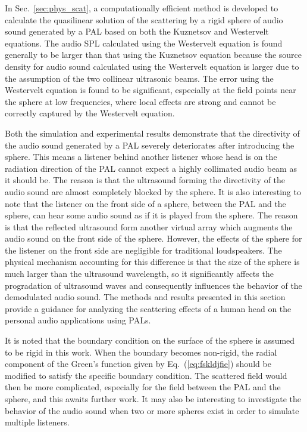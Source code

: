 In Sec.~\ref{sec:phys_scat}, a computationally efficient method is developed to calculate the quasilinear solution of the scattering by a rigid sphere of audio sound generated by a PAL based on both the Kuznetsov and Westervelt equations. The audio SPL calculated using the Westervelt equation is found generally to be larger than that using the Kuznetsov equation because the source density for audio sound calculated using the Westervelt equation is larger due to the assumption of the two collinear ultrasonic beams. The error using the Westervelt equation is found to be significant, especially at the field points near the sphere at low frequencies, where local effects are strong and cannot be correctly captured by the Westervelt equation. 

Both the simulation and experimental results demonstrate that the directivity of the audio sound generated by a PAL severely deteriorates after introducing the sphere. This means a listener behind another listener whose head is on the radiation direction of the PAL cannot expect a highly collimated audio beam as it should be. The reason is that the ultrasound forming the directivity of the audio sound are almost completely blocked by the sphere. It is also interesting to note that the listener on the front side of a sphere, between the PAL and the sphere, can hear some audio sound as if it is played from the sphere. The reason is that the reflected ultrasound form another virtual array which augments the audio sound on the front side of the sphere. However, the effects of the sphere for the listener on the front side are negligible for traditional loudspeakers. The physical mechanism accounting for this difference is that the size of the sphere is much larger than the ultrasound wavelength, so it significantly affects the progradation of ultrasound waves and consequently influences the behavior of the demodulated audio sound. 
The methods and results presented in this section provide a guidance for analyzing the scattering effects of a human head on the personal audio applications using PALs. 

It is noted that the boundary condition on the surface of the sphere is assumed to be rigid in this work. When the boundary becomes non-rigid, the radial component of the Green’s function given by Eq.~(\ref{eq:fskldjfie}) should be modified to satisfy the specific boundary condition. The scattered field would then be more complicated, especially for the field between the PAL and the sphere, and this awaits further work. It may also be interesting to investigate the behavior of the audio sound when two or more spheres exist in order to simulate multiple listeners.
